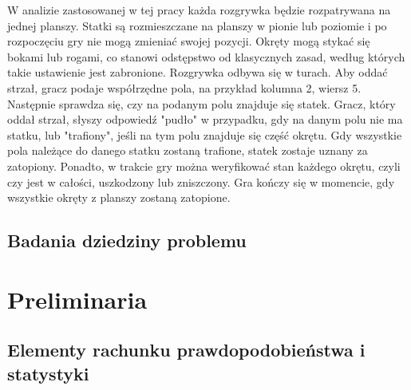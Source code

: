 \documentclass[magisterska]{pracadypl}
\begin{document}
W analizie zastosowanej w tej pracy każda rozgrywka będzie rozpatrywana na jednej planszy. Statki są rozmieszczane na planszy w pionie lub poziomie i po rozpoczęciu gry nie mogą zmieniać swojej pozycji. Okręty mogą stykać się bokami lub rogami, co stanowi odstępstwo od klasycznych zasad, według których takie ustawienie jest zabronione. Rozgrywka odbywa się w turach. Aby oddać strzał, gracz podaje współrzędne pola, na przykład kolumna 2, wiersz 5. Następnie sprawdza się, czy na podanym polu znajduje się statek. Gracz, który oddał strzał, słyszy odpowiedź "pudło" w przypadku, gdy na danym polu nie ma statku, lub "trafiony", jeśli na tym polu znajduje się część okrętu. Gdy wszystkie pola należące do danego statku zostaną trafione, statek zostaje uznany za zatopiony. Ponadto, w trakcie gry można weryfikować stan każdego okrętu, czyli czy jest w całości, uszkodzony lub zniszczony.
Gra kończy się w momencie, gdy wszystkie okręty z planszy zostaną zatopione.
\section{Badania dziedziny problemu}
\chapter{Preliminaria}
\section{Elementy rachunku prawdopodobieństwa i statystyki}
\end{document}
